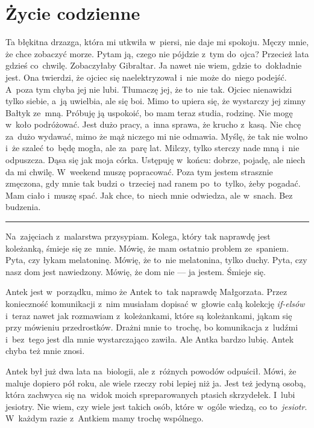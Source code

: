 \documentclass[9pt, a5paper]{memoir}
\begin{document}
\section{Życie codzienne}
Ta błękitna drzazga, która mi utkwiła w~piersi, nie daje mi spokoju. Męczy mnie, że chce zobaczyć morze. Pytam ją, czego nie pójdzie z~tym do~ojca? Przecież lata gdzieś co~chwilę. Zobaczyłaby Gibraltar. Ja nawet nie wiem, gdzie to~dokładnie jest. Ona twierdzi, że ojciec się naelektryzował i~nie może do~niego podejść. A~poza tym chyba jej nie lubi. Tłumaczę jej, że to~nie tak. Ojciec nienawidzi tylko siebie, a~ją uwielbia, ale się boi. Mimo to upiera się, że wystarczy jej zimny Bałtyk ze~mną. Próbuję ją uspokoić, bo mam teraz studia, rodzinę. Nie mogę w~koło podróżować. Jest dużo pracy, a~inna sprawa, że krucho z~kasą. Nie chcę za~dużo wydawać, mimo że mąż niczego mi nie odmawia. Myślę, że tak nie wolno i~że szaleć to~będę mogła, ale za~parę lat. Milczy, tylko sterczy nade mną i~nie odpuszcza. Dąsa się jak moja córka. Ustępuję w~końcu: dobrze, pojadę, ale niech da mi chwilę. W~weekend muszę popracować. Poza tym jestem strasznie zmęczona, gdy mnie tak budzi o~trzeciej nad ranem po~to~tylko, żeby pogadać. Mam ciało i~muszę spać. Jak chce, to~niech mnie odwiedza, ale w~snach. Bez budzenia.

\fancybreak{* \quad * \quad *}

Na~zajęciach z~malarstwa przysypiam. Kolega, który tak naprawdę jest koleżanką, śmieje się ze~mnie. Mówię, że mam ostatnio problem ze~spaniem. Pyta, czy łykam melatoninę. Mówię, że to~nie melatonina, tylko duchy. Pyta, czy nasz dom jest nawiedzony. Mówię, że dom nie --- ja jestem. Śmieje się.

Antek jest w~porządku, mimo że Antek to~tak naprawdę Małgorzata. Przez konieczność komunikacji z~nim musiałam dopisać w~głowie całą kolekcję \textit{if-elsów} i~teraz nawet jak rozmawiam z~koleżankami, które są koleżankami, jąkam się przy mówieniu przedrostków. Drażni mnie to~trochę, bo komunikacja z~ludźmi i~bez~tego jest dla mnie wystarczająco zawiła. Ale Antka bardzo lubię. Antek chyba też mnie znosi.

Antek był już dwa lata na~biologii, ale z~różnych powodów odpuścił. Mówi, że maluje dopiero pół roku, ale wiele rzeczy robi lepiej niż ja. Jest też jedyną osobą, która zachwyca się na~widok moich spreparowanych ptasich skrzydełek. I~lubi jesiotry. Nie wiem, czy wiele jest takich osób, które w~ogóle wiedzą, co to~\textit{jesiotr}. W~każdym razie z~Antkiem mamy trochę wspólnego.
\end{document}
